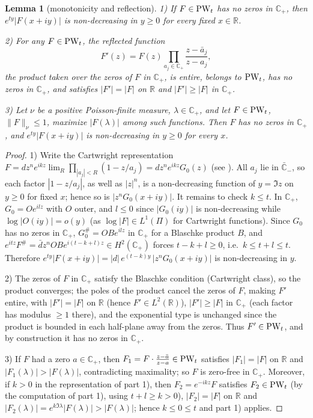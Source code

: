 \documentclass[11pt,twoside,reqno]{amsart}
\def\PW{\text{\rm PW}}
\def\R{{\mathbb R}}
\def\C{{\mathbb{C}}}
\def\l{\lambda}
\theoremstyle{plain}
\newtheorem{lemma}{Lemma}
\numberwithin{equation}{section}
\begin{document}
\begin{lemma}[monotonicity and reflection]\label{lemAMon}
1) If $F\in\PW_t$ has no zeros in $\C_+$, then $e^{ty}|F(x+iy)|$ is non-decreasing in $y\geq0$ for every fixed $x\in\R$.

2) For any $F\in\PW_t$, the reflected function
$$F'(z)=F(z)\prod_{a_j\in\C_+}\frac{z-\bar a_j}{z-a_j},$$
the product taken over the zeros of $F$ in $\C_+$, is entire, belongs to $\PW_t$, has no zeros in $\C_+$, and satisfies $|F'|=|F|$ on $\R$ and $|F'|\geq|F|$ in $\C_+$.

3) Let $\nu$ be a positive Poisson-finite measure, $\l\in\C_+$, and let $F\in\PW_t$, $\|F\|_\nu\leq1$, maximize $|F(\l)|$ among such functions. Then $F$ has no zeros in $\C_+$, and $e^{ty}|F(x+iy)|$ is non-decreasing in $y\geq0$ for every $x$.
\end{lemma}

\begin{proof}
1) Write the Cartwright representation $F=d z^ne^{ikz}\lim_R\prod_{|a_j|<R}(1-z/a_j)=dz^ne^{ikz}G_0(z)$ (see \cite{dBr}). All $a_j$ lie in $\bar\C_-$, so each factor $|1-z/a_j|$, as well as $|z|^n$, is a non-decreasing function of $y=\Im z$ on $y\geq0$ for fixed $x$; hence so is $|z^nG_0(x+iy)|$. It remains to check $k\leq t$. In $\C_+$, $G_0=Oe^{ilz}$ with $O$ outer, and $l\leq0$ since $|G_0(iy)|$ is non-decreasing while $\log|O(iy)|=o(y)$ (as $\log|F|\in L^1(\Pi)$ for Cartwright functions). Since $G_0$ has no zeros in $\C_+$, $G_0^\#=OBe^{ilz}$ in $\C_+$ for a Blaschke product $B$, and $e^{itz}F^\#=\bar d z^nOBe^{i(t-k+l)z}\in H^2(\C_+)$ forces $t-k+l\geq0$, i.e.\ $k\leq t+l\leq t$. Therefore $e^{ty}|F(x+iy)|=|d|\,e^{(t-k)y}\,|z^nG_0(x+iy)|$ is non-decreasing in $y$.

2) The zeros of $F$ in $\C_+$ satisfy the Blaschke condition (Cartwright class), so the product converges; the poles of the product cancel the zeros of $F$, making $F'$ entire, with $|F'|=|F|$ on $\R$ (hence $F'\in L^2(\R)$), $|F'|\geq|F|$ in $\C_+$ (each factor has modulus $\geq1$ there), and the exponential type is unchanged since the product is bounded in each half-plane away from the zeros. Thus $F'\in\PW_t$, and by construction it has no zeros in $\C_+$.

3) If $F$ had a zero $a\in\C_+$, then $F_1=F\cdot\frac{z-\bar a}{z-a}\in\PW_t$ satisfies $|F_1|=|F|$ on $\R$ and $|F_1(\l)|>|F(\l)|$, contradicting maximality; so $F$ is zero-free in $\C_+$. Moreover, if $k>0$ in the representation of part 1), then $F_2=e^{-ikz}F$ satisfies $F_2\in\PW_t$ (by the computation of part 1), using $t+l\geq k>0$), $|F_2|=|F|$ on $\R$ and $|F_2(\l)|=e^{k\Im\l}|F(\l)|>|F(\l)|$; hence $k\leq0\leq t$ and part 1) applies.
\end{proof}
\end{document}
